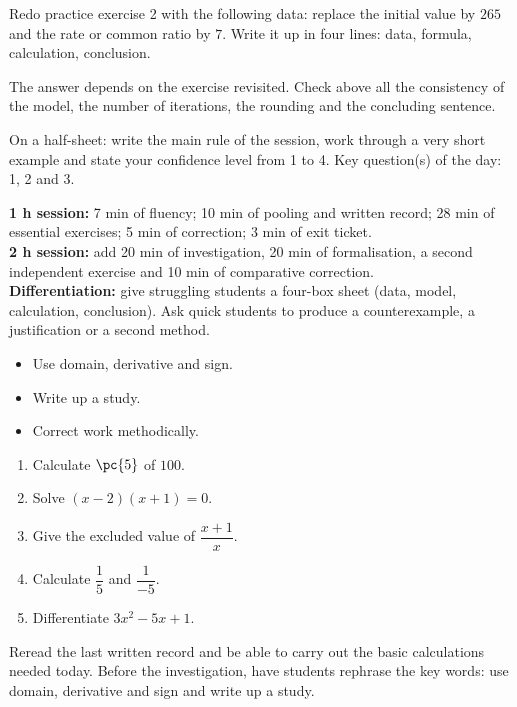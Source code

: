 
\begin{homework}Redo practice exercise 2 with the following data: replace the initial value by $265$ and the rate or common ratio by $7$. Write it up in four lines: data, formula, calculation, conclusion.\end{homework}
\begin{solution}The answer depends on the exercise revisited. Check above all the consistency of the model, the number of iterations, the rounding and the concluding sentence.\end{solution}

\begin{exitticket}[3 minutes]On a half-sheet: write the main rule of the session, work through a very short example and state your confidence level from 1 to 4. Key question(s) of the day: 1, 2 and 3.\end{exitticket}

\ifmxteacher
\begin{method}
\textbf{1 h session:} 7 min of fluency; 10 min of pooling and written record; 28 min of essential exercises; 5 min of correction; 3 min of exit ticket.\\
\textbf{2 h session:} add 20 min of investigation, 20 min of formalisation, a second independent exercise and 10 min of comparative correction.\\
\textbf{Differentiation:} give struggling students a four-box sheet (data, model, calculation, conclusion). Ask quick students to produce a counterexample, a justification or a second method.
\end{method}
\fi
{}
\begin{objectives}\begin{itemize}\item Use domain, derivative and sign.\item Write up a study.\item Correct work methodically.\end{itemize}\end{objectives}
\begin{fluency}\begin{enumerate}\item Calculate $\pc{5}$ of $100$. \item Solve $(x-2)(x+1)=0$. \item Give the excluded value of $\dfrac{x+1}{x}$. \item Calculate $\dfrac1{5}$ and $\dfrac1{-5}$. \item Differentiate $3x^2-5x+1$. \end{enumerate}\end{fluency}
\begin{prerequisites}Reread the last written record and be able to carry out the basic calculations needed today. Before the investigation, have students rephrase the key words: use domain, derivative and sign and write up a study.\end{prerequisites}

